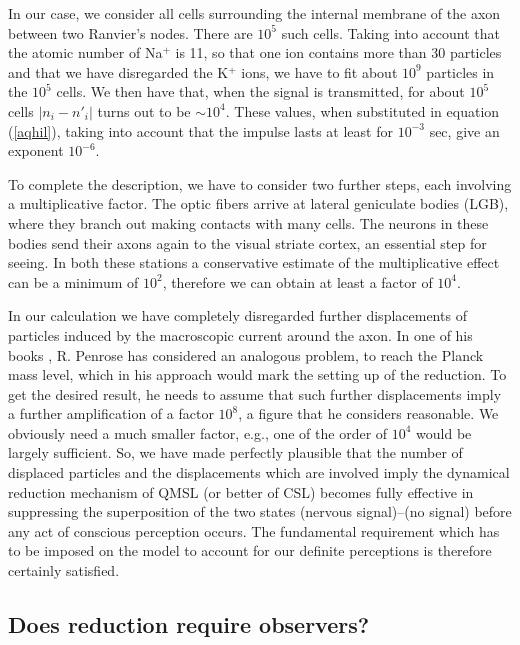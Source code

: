 \documentclass[10pt,a4paper]{article}
\begin{document}
In our case, we consider all cells surrounding the internal
membrane of the axon between two Ranvier's nodes. There are
$10^{5}$ such cells. Taking into account that the atomic number of
Na$^{+}$ is 11, so that one ion contains more than 30 particles
and that we have disregarded the K$^{+}$ ions, we have to fit
about $10^{9}$ particles in the $10^{5}$ cells. We then have that,
when the signal is transmitted, for about $10^{5}$ cells $|n_{i} -
{n'}_{i}|$ turns out to be $\sim 10^{4}$. These values, when
substituted in equation (\ref{aqhil}), taking into account that
the impulse lasts at least for $10^{-3}$ sec, give an exponent
$10^{-6}$.

To complete the description, we have to consider two further
steps, each involving a multiplicative factor. The optic fibers
arrive at lateral geniculate bodies (LGB), where they branch out
making contacts with many cells. The neurons in these bodies send
their axons again to the visual striate cortex, an essential step
for seeing. In both these stations a conservative estimate of the
multiplicative effect \cite{hub} can be a minimum of $10^{2}$,
therefore we can obtain at least a factor of $10^{4}$.

In our calculation we have completely disregarded further
displacements of particles induced by the macroscopic current
around the axon. In one of his books \cite{penenm}, R. Penrose has
considered an analogous problem, to reach the Planck mass level,
which in his approach would mark the setting up of the reduction.
To get the desired result, he needs to assume that such further
displacements imply a further amplification of a factor $10^{8}$,
a figure that he considers reasonable. We obviously need a much
smaller factor, e.g., one of the order of $10^{4}$ would be
largely sufficient. So, we have made perfectly plausible that the
number of displaced particles and the displacements which are
involved imply the dynamical reduction mechanism of QMSL (or
better of CSL) becomes fully effective in suppressing the
superposition of the two states (nervous signal)--(no signal)
before any act of conscious perception occurs. The fundamental
requirement which has to be imposed on the model to account for
our definite perceptions is therefore certainly satisfied.


\subsection{Does reduction require observers?} \label{sec144}
\end{document}
